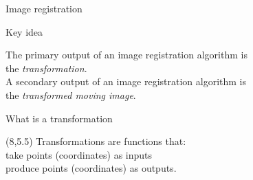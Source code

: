 \documentclass[aspectratio=169]{beamer}
\begin{document}
\begin{frame}{Image registration}
{\begin{center}
        \end{center}
    }

\end{frame}

\begin{frame}{Key idea}

    The primary output of an image registration algorithm is \\
    the \emph{transformation}. \\ 
    \vspace{1em}
    A secondary output of an image registration algorithm is \\ 
    the \emph{transformed moving image}.

\end{frame}

\begin{frame}{What is a transformation}


    \begin{textblock}{7}(8,5.5)
        Transformations are functions that: \\
        take points (coordinates) as inputs \\
        produce points (coordinates) as outputs. \\ 
    \end{textblock}


\end{frame}
\end{document}
